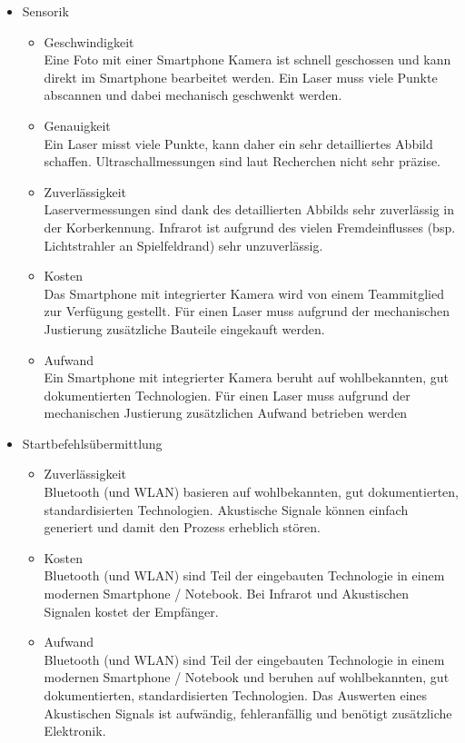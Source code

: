 \begin{itemize}
			\item Sensorik
				\begin{itemize}
					\item Geschwindigkeit\\
					Eine Foto mit einer Smartphone Kamera ist schnell geschossen und kann direkt im Smartphone bearbeitet werden. Ein Laser muss viele Punkte abscannen und dabei mechanisch geschwenkt werden.
					\item Genauigkeit\\
					Ein Laser misst viele Punkte, kann daher ein sehr detailliertes Abbild schaffen. Ultraschallmessungen sind laut Recherchen nicht sehr präzise.  
					\item Zuverlässigkeit\\
					Laservermessungen sind dank des detaillierten Abbilds sehr zuverlässig in der Korberkennung. Infrarot ist aufgrund des vielen Fremdeinflusses (bsp. Lichtstrahler an Spielfeldrand) sehr unzuverlässig.
					\item Kosten\\
					Das Smartphone mit integrierter Kamera wird von einem Teammitglied zur Verfügung gestellt. Für einen Laser muss aufgrund der mechanischen Justierung zusätzliche Bauteile eingekauft werden.
					\item Aufwand\\
					Ein Smartphone mit integrierter Kamera beruht auf wohlbekannten, gut dokumentierten Technologien. Für einen Laser muss aufgrund der mechanischen Justierung zusätzlichen Aufwand betrieben werden
				\end{itemize}
				
			\item Startbefehlsübermittlung
				\begin{itemize}
					\item Zuverlässigkeit\\
					Bluetooth (und WLAN) basieren auf wohlbekannten, gut dokumentierten, standardisierten Technologien. Akustische Signale können einfach generiert und damit den Prozess erheblich stören.
					\item Kosten\\
					Bluetooth (und WLAN) sind Teil der eingebauten Technologie in einem modernen Smartphone / Notebook. Bei Infrarot und Akustischen Signalen kostet der Empfänger.
					\item Aufwand\\
					Bluetooth (und WLAN) sind Teil der eingebauten Technologie in einem modernen Smartphone / Notebook und beruhen auf wohlbekannten, gut dokumentierten, standardisierten Technologien. Das Auswerten eines Akustischen Signals ist aufwändig, fehleranfällig und benötigt zusätzliche Elektronik.
				\end{itemize}
				

\end{itemize}
